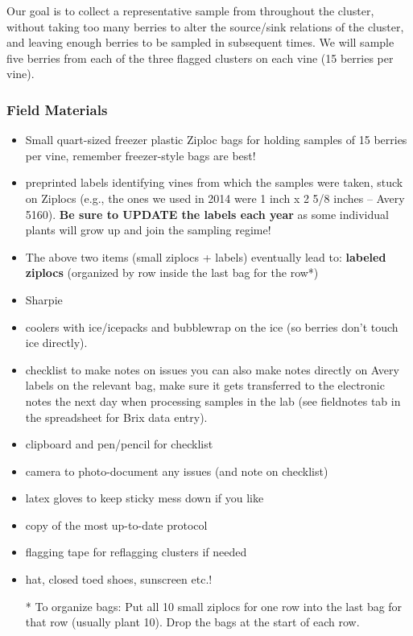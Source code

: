 \documentclass[11pt,letter]{article}
\newenvironment{smitemize}{
\begin{itemize}
  \setlength{\itemsep}{0pt}
  \setlength{\parskip}{0.8pt}
  \setlength{\parsep}{0pt}}
{\end{itemize}
}
\begin{document}
Our goal is to collect a representative sample from throughout the cluster, without taking too many berries to alter the source/sink relations of the cluster, and leaving enough berries to be sampled in subsequent times. We will sample five berries from each of the three flagged clusters on each vine (15 berries per vine). 

\subsubsection{Field Materials}
\begin{smitemize}
\item Small quart-sized freezer plastic Ziploc bags for holding samples of 15 berries per vine, remember freezer-style bags are best!
\item preprinted labels identifying vines from which the samples were taken, stuck on Ziplocs (e.g., the ones we used in 2014 were 1 inch x 2 5/8 inches -- Avery 5160). {\bf Be sure to UPDATE the labels each year} as some individual plants will grow up and join the sampling regime!
\item The above two items (small ziplocs + labels) eventually lead to: {\bf labeled ziplocs} (organized by row inside the last bag for the row*)
\item Sharpie
\item coolers with ice/icepacks and bubblewrap on the ice (so berries don’t touch ice directly). 
\item checklist to make notes on issues you can also make notes directly on Avery labels on the relevant bag, make sure it gets transferred to the electronic notes the next day  when processing samples in the lab (see fieldnotes tab in the spreadsheet for Brix data entry). 
\item clipboard and pen/pencil for checklist
\item camera to photo-document any issues (and note on checklist)
\item latex gloves to keep sticky mess down if you like
\item copy of the most up-to-date protocol
\item flagging tape for reflagging clusters if needed
\item hat, closed toed shoes, sunscreen etc.!

* To organize bags: Put all 10 small ziplocs for one row into the last bag for that row (usually plant 10). Drop the bags at the start of each row.

\end{smitemize}
\end{document}
